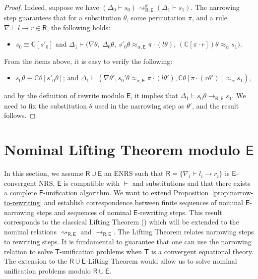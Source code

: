 \documentclass[submission,copyright,creativecommons]{eptcs}
\newcommand{\daniele}[1]{\textcolor{cyan}{#1}}
\newcommand{\aleq}{\approx_{\alpha}}
\newcommand{\ealeq}{\approx_{\alpha,\theory{E}}}
\newcommand{\theory}[1]{\ensuremath{\mathsf{#1}}}
\newcommand{\context}[1]{\mathbb{C}}
\theoremstyle{plain}
\theoremstyle{definition}
\theoremstyle{remark}
\begin{document}
\begin{proof}
    Indeed, suppose we have $(\Delta_0\vdash s_0) \rightsquigarrow_{\theory{R,E}}^{\theta} (\Delta_1 \vdash s_1) $. The narrowing step guarantees that for a substitution $\theta$, some permutation $\pi$, and a rule $\nabla\vdash l\to r\in \theory{R}$, the following holds:  
    \begin{itemize}
        \item $s_0 \equiv \context{C}[s'_0]$ and $\Delta_1\vdash \big(\nabla\theta,~\Delta_0\theta,~ s'_0\theta \ealeq \pi\cdot (l\theta), \,(\context{C}[\pi\cdot r])\theta \aleq s_1\big)$. 
    \end{itemize}

   From the items above, it is easy to verify  the following:
   \begin{itemize} 
   \item $s_0\theta \equiv \context{C}\theta[s'_0\theta]$; and    $\Delta_1 \vdash (\nabla\theta', s_0'\theta \ealeq \pi\cdot (l\theta'), \context{C}\theta[\pi\cdot(r\theta')] \aleq s_1)$, 
   \end{itemize} 
   and  by the definition of rewrite modulo $\theory{E}$,  it implies that  $\Delta_1 \vdash s_0\theta \rightarrow_{\theory{R,E}} s_1$.
    We need to fix the substitution $\theta$ used in the narrowing step as $\theta'$, and the result follows.
\end{proof}


\section{Nominal Lifting Theorem modulo \theory{E}}\label{section:NomLiftingModuloC}

In this section, we assume $\theory{R}\cup \theory{E}$ an ENRS such that  $\theory{R}=\{\nabla_i\vdash l_i\to r_i\}$ is $\theory{E}$-convergent NRS, \theory{E} is compatible with $\vdash$ and substitutions and that there exists a complete \theory{E}-unification algorithm. We want to extend Proposition~\ref{prop:narrow-to-rewriting}  and establish correspondence between finite sequences of nominal $\theory{E}$-narrowing steps and sequences of nominal $\theory{E}$-rewriting steps. This result corresponds to the classical Lifting Theorem (\cite{Hullot80,JouannaudKK83:Incremental,NominalNarrowing16}) which will be extended to the nominal relations $\rightsquigarrow_{\theory{R,E}}$ and $\to_{\theory{R,E}}$. The Lifting Theorem relates narrowing steps to rewriting steps. It is fundamental to guarantee that one can use the narrowing relation to solve \theory{T}-unification problems when \theory{T} is a convergent equational theory. The extension to the \theory{R\cup E}-Lifting Theorem would allow us to solve nominal unification problems modulo $\theory{R}\cup \theory{E}$.
\end{document}
